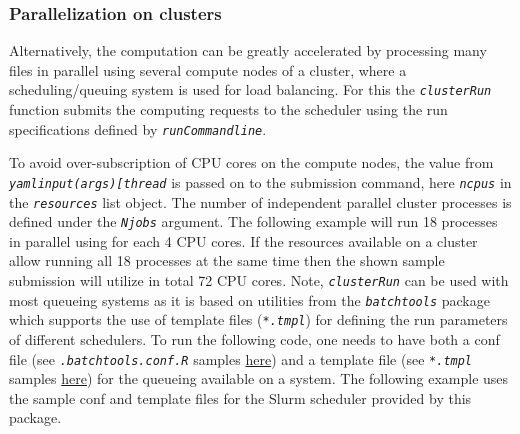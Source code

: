 \documentclass[14pt,]{article}
\begin{document}
\hypertarget{parallelization-on-clusters}{%
\subsubsection{Parallelization on clusters}\label{parallelization-on-clusters}}

Alternatively, the computation can be greatly accelerated by processing many files
in parallel using several compute nodes of a cluster, where a scheduling/queuing
system is used for load balancing. For this the \emph{\texttt{clusterRun}} function submits
the computing requests to the scheduler using the run specifications
defined by \emph{\texttt{runCommandline}}.

To avoid over-subscription of CPU cores on the compute nodes, the value from
\emph{\texttt{yamlinput(args){[}\textquotesingle{}thread\textquotesingle{}{]}}} is passed on to the submission command, here \emph{\texttt{ncpus}}
in the \emph{\texttt{resources}} list object. The number of independent parallel cluster
processes is defined under the \emph{\texttt{Njobs}} argument. The following example will run
18 processes in parallel using for each 4 CPU cores. If the resources available
on a cluster allow running all 18 processes at the same time then the shown sample
submission will utilize in total 72 CPU cores. Note, \emph{\texttt{clusterRun}} can be used
with most queueing systems as it is based on utilities from the \emph{\texttt{batchtools}}
package which supports the use of template files (\emph{\texttt{*.tmpl}}) for defining the
run parameters of different schedulers. To run the following code, one needs to
have both a conf file (see \emph{\texttt{.batchtools.conf.R}} samples \href{https://mllg.github.io/batchtools/}{here})
and a template file (see \emph{\texttt{*.tmpl}} samples \href{https://github.com/mllg/batchtools/tree/master/inst/templates}{here})
for the queueing available on a system. The following example uses the sample
conf and template files for the Slurm scheduler provided by this package.
\end{document}
